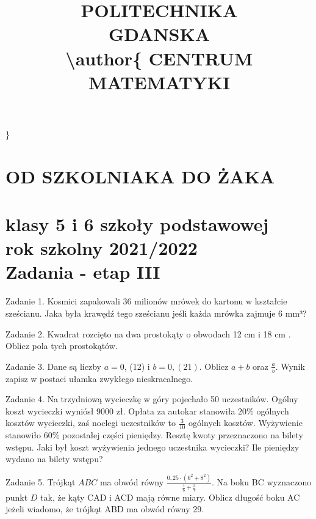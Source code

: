 \documentclass[10pt]{article}
\title{POLITECHNIKA \\
 GDANSKA \\
 \textbackslash author\{ CENTRUM MATEMATYKI }
\author{}
\date{}
\begin{document}
\maketitle
\}

\section*{OD SZKOLNIAKA DO ŻAKA}
\section*{klasy 5 i 6 szkoły podstawowej \\
 rok szkolny 2021/2022 \\
 Zadania - etap III}
Zadanie 1. Kosmici zapakowali 36 milionów mrówek do kartonu w kształcie sześcianu. Jaka była krawędź tego sześcianu jeśli każda mrówka zajmuje 6 mm³?

Zadanie 2. Kwadrat rozcięto na dwa prostokąty o obwodach 12 cm i 18 cm . Oblicz pola tych prostokątów.

Zadanie 3. Dane są liczby \(a=0\), (12) i \(b=0,(21)\). Oblicz \(a+b\) oraz \(\frac{a}{b}\). Wynik zapisz w postaci ułamka zwykłego nieskracalnego.

Zadanie 4. Na trzydniową wycieczkę w góry pojechało 50 uczestników. Ogólny koszt wycieczki wyniósł 9000 zł. Opłata za autokar stanowiła \(20 \%\) ogólnych kosztów wycieczki, zaś noclegi uczestników to \(\frac{3}{10}\) ogólnych kosztów. Wyżywienie stanowiło 60\% pozostałej części pieniędzy. Resztę kwoty przeznaczono na bilety wstępu. Jaki był koszt wyżywienia jednego uczestnika wycieczki? Ile pieniędzy wydano na bilety wstępu?

Zadanie 5. Trójkąt \(A B C\) ma obwód równy \(\frac{0,25 \cdot\left(6^{2}+8^{2}\right)}{\frac{1}{6}+\frac{3}{7}}\). Na boku BC wyznaczono punkt \(D\) tak, że kąty CAD i ACD mają równe miary. Oblicz długość boku AC jeżeli wiadomo, że trójkąt ABD ma obwód równy 29.
\end{document}
